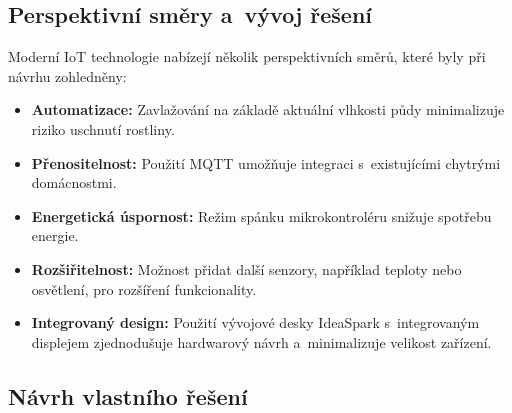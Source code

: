 \documentclass[a4paper, 11pt]{article}
\begin{document}
\subsection{Perspektivní směry a~vývoj řešení}

Moderní IoT technologie nabízejí několik perspektivních směrů, které byly při návrhu zohledněny:
\begin{itemize}
    \item \textbf{Automatizace:} Zavlažování na základě aktuální vlhkosti půdy minimalizuje riziko uschnutí rostliny.
    \item \textbf{Přenositelnost:} Použití MQTT umožňuje integraci s~existujícími chytrými domácnostmi.
    \item \textbf{Energetická úspornost:} Režim spánku mikrokontroléru snižuje spotřebu energie.
    \item \textbf{Rozšiřitelnost:} Možnost přidat další senzory, například teploty nebo osvětlení, pro rozšíření funkcionality.
    \item \textbf{Integrovaný design:} Použití vývojové desky IdeaSpark s~integrovaným displejem zjednodušuje hardwarový návrh a~minimalizuje velikost zařízení.
\end{itemize}

\subsection{Návrh vlastního řešení}
\end{document}

